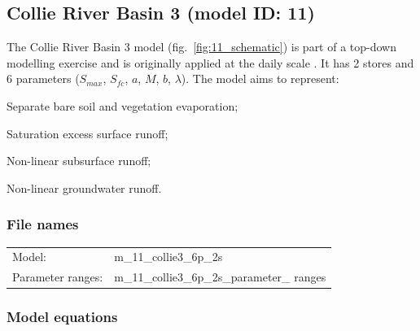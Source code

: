 \subsection{Collie River Basin 3 (model ID: 11)}
The Collie River Basin 3 model (fig.~\ref{fig:11_schematic}) is part of a top-down modelling exercise and is originally applied at the daily scale \citep{Jothityangkoon2001}. It has 2 stores and 6 parameters ($S_{max}$, $S_{fc}$, $a$, $M$, $b$, $\lambda$). The model aims to represent:

\begin{itemizecompact}
\item Separate bare soil and vegetation evaporation;
\item Saturation excess surface runoff;
\item Non-linear subsurface runoff;
\item Non-linear groundwater runoff.
\end{itemizecompact}

\subsubsection{File names}
\begin{tabular}{@{}ll}
Model: &m\_11\_collie3\_6p\_2s \\
Parameter ranges: &m\_11\_collie3\_6p\_2s\_parameter\_ ranges \\
\end{tabular}

\subsubsection{Model equations}

